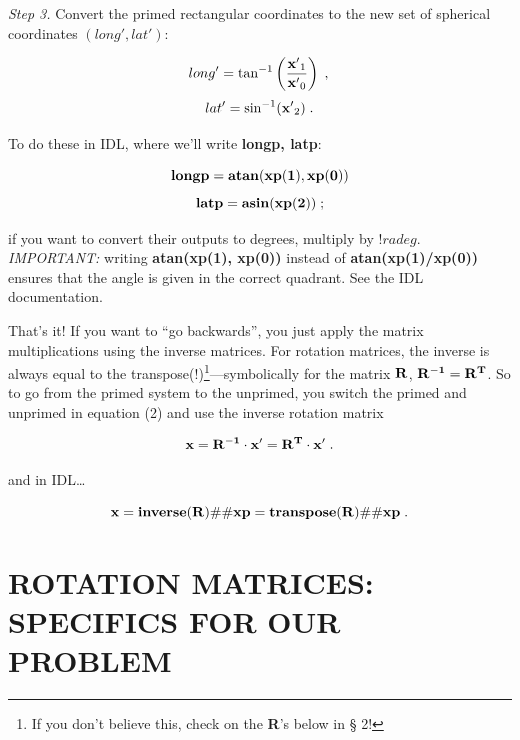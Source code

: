 \documentclass[11pt,preprint]{aastex}
\begin{document}
	{\it Step 3.} Convert the primed rectangular coordinates to the
new set of spherical coordinates $(long', lat')$:

\begin{mathletters} 
\begin{equation} 
long' = \tan^{-1} \left({{\bf x'}_1 \over {\bf x'}_0}\right) \; , \\ 
\end{equation} 
\begin{equation} 
lat' =
\sin^{-1} ({\bf x'}_2) \; .  
\end{equation} 
\end{mathletters}

\noindent To do these in IDL, where we'll write {\bf longp, latp}:

\begin{mathletters}
\begin{equation}
{\bf longp = atan(xp(1), xp(0))}
\end{equation}
\begin{equation}
{\bf latp = asin(xp(2))} \; ;
\end{equation}
\end{mathletters}

\noindent if you want to convert their outputs to degrees, multiply by
$!radeg$.  {\it IMPORTANT:} writing {\bf atan(xp(1), xp(0))} instead of
{\bf atan(xp(1)/xp(0))} ensures that the angle is given in the correct
quadrant.  See the IDL documentation. 

	That's it! If you want to ``go backwards'', you just apply the
matrix multiplications using the inverse matrices.  For rotation
matrices, the inverse is always equal to the transpose(!)\footnote{If
you don't believe this, check on the {\bf R}'s below in \S
2!}---symbolically for the matrix ${\bf R}$, ${\bf R^{-1}} = {\bf R^T}$. 
So to go from the primed system to the unprimed, you switch the primed
and unprimed in equation (2) and use the inverse rotation matrix

\begin{equation}
{\bf x} = {\bf R^{-1} \cdot x'} = {\bf R^T \cdot x'}\; .
\end{equation}

\noindent and in IDL\dots

\begin{equation} 
{\bf x} = {\bf inverse(R) } \#\# {\bf xp} = {\bf transpose(R) } 
\#\# {\bf xp} \; .  
\end{equation}

\section {ROTATION MATRICES: SPECIFICS FOR OUR PROBLEM}
\end{document}
